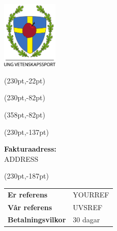 \documentclass[a4paper,11pt]{article}
\begin{document}
\pagestyle{fancy}
\fancyhf{}
\renewcommand{\headrulewidth}{0pt}
\renewcommand{\footrulewidth}{0pt}

\setlength{\fboxsep}{1.5em}
\setlength{\parindent}{0pt}

\includegraphics[width=0.2\textwidth]{logo.png}



\fancyput*(230pt,-22pt){}

\fancyput*(230pt,-82pt){}

\fancyput*(358pt,-82pt){}

\fancyput*(230pt,-137pt){}

\vspace{3em}
\textbf{Fakturaadress:}\\[1em]
ADDRESS

\fancyput*(230pt,-187pt){
    \begin{minipage}{85pt}
      \begin{tabular}{ll}
        \textbf{Er referens} & YOURREF \\
        \textbf{Vår referens} & UVSREF \\
        \textbf{Betalningsvilkor} & 30 dagar
      \end{tabular}
    \end{minipage}}

\vspace{5em}
\end{document}
